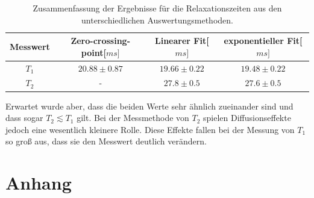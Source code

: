 \documentclass[12pt,a4paper]{article}
\begin{document}
\begin{table}[H]
\centering
\begin{tabular}{|c|c|c|c|}
\hline
Messwert & Zero-crossing-point[$ms]$ &Linearer Fit[$ms]$ & exponentieller Fit[$ms]$\\
\hline
$T_1$ & $20.88\pm 0.87$ & $19.66\pm 0.22$ & $19.48\pm 0.22$\\
\hline
$T_2$ & - & $27.8\pm 0.5$ & $27.6\pm 0.5$\\
\hline
\end{tabular}
\caption{Zusammenfassung der Ergebnisse für die Relaxationszeiten aus den unterschiedlichen Auswertungsmethoden.}
\label{GesamtZusammenfassung}
\end{table}
Erwartet wurde aber, dass die beiden Werte sehr ähnlich zueinander sind und dass sogar $T_2 \lesssim T_1$ gilt. Bei der Messmethode von $T_2$ spielen Diffusionseffekte jedoch eine wesentlich kleinere Rolle. Diese Effekte fallen bei der Messung von $T_1$ so groß aus, dass sie den Messwert deutlich verändern.

\newpage

\section{Anhang}
\end{document}
